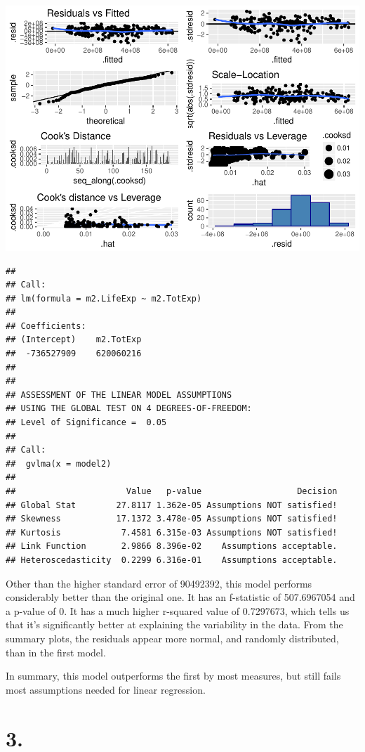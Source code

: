 \documentclass[]{article}
\begin{document}
\includegraphics{JSturm_Assignment_12_files/figure-latex/model-two-1.pdf}

\begin{verbatim}
## 
## Call:
## lm(formula = m2.LifeExp ~ m2.TotExp)
## 
## Coefficients:
## (Intercept)    m2.TotExp  
##  -736527909    620060216  
## 
## 
## ASSESSMENT OF THE LINEAR MODEL ASSUMPTIONS
## USING THE GLOBAL TEST ON 4 DEGREES-OF-FREEDOM:
## Level of Significance =  0.05 
## 
## Call:
##  gvlma(x = model2) 
## 
##                      Value   p-value                   Decision
## Global Stat        27.8117 1.362e-05 Assumptions NOT satisfied!
## Skewness           17.1372 3.478e-05 Assumptions NOT satisfied!
## Kurtosis            7.4581 6.315e-03 Assumptions NOT satisfied!
## Link Function       2.9866 8.396e-02    Assumptions acceptable.
## Heteroscedasticity  0.2299 6.316e-01    Assumptions acceptable.
\end{verbatim}

Other than the higher standard error of 90492392, this model performs
considerably better than the original one. It has an f-statistic of
507.6967054 and a p-value of \(0\). It has a much higher r-squared value
of 0.7297673, which tells us that it's significantly better at
explaining the variability in the data. From the summary plots, the
residuals appear more normal, and randomly distributed, than in the
first model.

In summary, this model outperforms the first by most measures, but still
fails most assumptions needed for linear regression.

\section{3.}\label{section-2}
\end{document}
